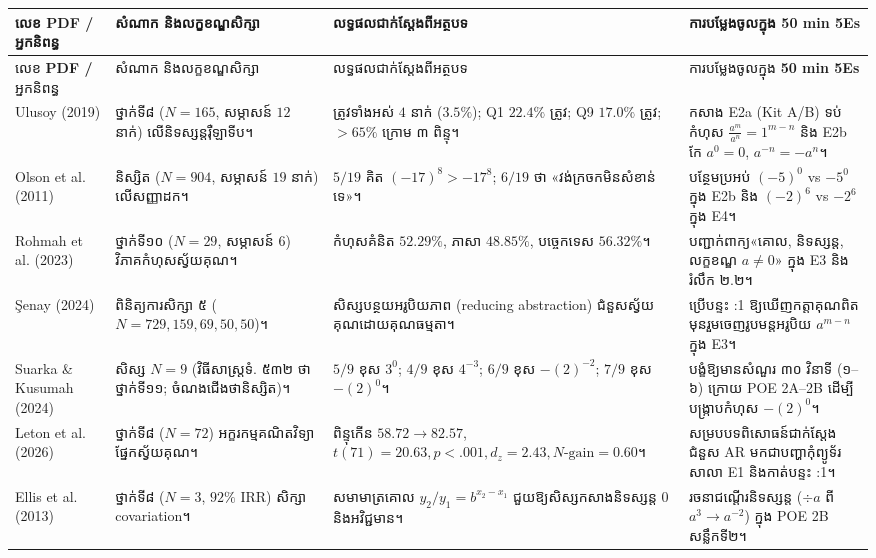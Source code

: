 \documentclass[a4paper,12pt]{article}
\newcommand{\en}[1]{{\TimesEn #1}}
\newcommand{\enbf}[1]{{\TimesEn\bfseries #1}}
\newcommand{\tblhead}[1]{{\linespread{1.0}\muol\fontsize{10.2pt}{16pt}\selectfont #1\par}}
\begin{document}
{\linespread{1.0}\fontsize{10.2pt}{15.5pt}\selectfont
\renewcommand{\arraystretch}{1.18}
\begin{longtable}{|L{2.30cm}|L{4.55cm}|L{5.10cm}|L{4.90cm}|}
\hline
{}
\tblhead{លេខ \enbf{PDF /} អ្នកនិពន្ធ} & \tblhead{សំណាក និងលក្ខខណ្ឌសិក្សា} & \tblhead{លទ្ធផលជាក់ស្ដែងពីអត្ថបទ} & \tblhead{ការបម្លែងចូលក្នុង \enbf{50 min 5Es}} \\
\hline
\endfirsthead
\hline
{}
\tblhead{លេខ \enbf{PDF /} អ្នកនិពន្ធ} & \tblhead{សំណាក និងលក្ខខណ្ឌសិក្សា} & \tblhead{លទ្ធផលជាក់ស្ដែងពីអត្ថបទ} & \tblhead{ការបម្លែងចូលក្នុង \enbf{50 min 5Es}} \\
\hline
\endhead
\en{[01] Ulusoy (2019)} & ថ្នាក់ទី៨ ($N=165$, សម្ភាសន៍ $12$ នាក់) លើនិទស្សន្តរ៉ឺឡាទីប។ & ត្រូវទាំងអស់ $4$ នាក់ ($3.5\%$); \en{Q1} $22.4\%$ ត្រូវ; \en{Q9} $17.0\%$ ត្រូវ; $>65\%$ ក្រោម ៣ ពិន្ទុ។ & កសាង \en{E2a (Kit A/B)} ទប់កំហុស $\frac{a^m}{a^n}=1^{m-n}$ និង \en{E2b} កែ $a^0=0$, $a^{-n}=-a^n$។ \\
\hline
\en{[02] Olson et al. (2011)} & និស្សិត ($N=904$, សម្ភាសន៍ $19$ នាក់) លើសញ្ញាដក។ & $5/19$ គិត $(-17)^8>-17^8$; $6/19$ ថា «វង់ក្រចកមិនសំខាន់ទេ»។ & បន្ថែមប្រអប់ $(-5)^0$ \en{vs} $-5^0$ ក្នុង \en{E2b} និង $(-2)^6$ \en{vs} $-2^6$ ក្នុង \en{E4}។ \\
\hline
\en{[03] Rohmah et al. (2023)} & ថ្នាក់ទី១០ ($N=29$, សម្ភាសន៍ $6$) វិភាគកំហុសស្វ័យគុណ។ & កំហុសគំនិត $52.29\%$, ភាសា $48.85\%$, បច្ចេកទេស $56.32\%$។ & បញ្ជាក់ពាក្យ«គោល, និទស្សន្ត, លក្ខខណ្ឌ $a\neq 0$» ក្នុង \en{E3} និងរំលឹក ២.២។ \\
\hline
\en{[04] \c{S}enay (2024)} & ពិនិត្យការសិក្សា ៥ ($N=729, 159, 69, 50, 50$)។ & សិស្សបន្ថយអរូបិយភាព \en{(reducing abstraction)} ជំនួសស្វ័យគុណដោយគុណធម្មតា។ & ប្រើបន្ទះ \en{1:1} ឱ្យឃើញកត្តាគុណពិតមុនរួមចេញរូបមន្តអរូបិយ $a^{m-n}$ ក្នុង \en{E3}។ \\
\hline
\en{[05] Suarka \& Kusumah (2024)} & សិស្ស $N=9$ (វិធីសាស្រ្តទំ. ៥៣២ ថាថ្នាក់ទី១១; ចំណងជើងថានិស្សិត)។ & $5/9$ ខុស $3^0$; $4/9$ ខុស $4^{-3}$; $6/9$ ខុស $-(2)^{-2}$; $7/9$ ខុស $-(2)^0$។ & បង្ខំឱ្យមានសំណួរ ៣០ វិនាទី (១--៦) ក្រោយ \en{POE 2A--2B} ដើម្បីបង្ក្រាបកំហុស $-(2)^0$។ \\
\hline
\en{[06] Leton et al. (2026)} & ថ្នាក់ទី៨ ($N=72$) អក្ខរកម្មគណិតវិទ្យាផ្នែកស្វ័យគុណ។ & ពិន្ទុកើន $58.72\to 82.57$, $t(71)=20.63, p<.001, d_z=2.43, N\text{-gain}=0.60$។ & សម្របបទពិសោធន៍ជាក់ស្ដែងជំនួស \en{AR} មកជាបញ្ហាកុំព្យូទ័រសាលា \en{E1} និងកាត់បន្ទះ \en{1:1}។ \\
\hline
\en{[07] Ellis et al. (2013)} & ថ្នាក់ទី៨ ($N=3$, $92\%$ \en{IRR}) សិក្សា \en{covariation}។ & សមាមាត្រគោល $y_2/y_1=b^{x_2-x_1}$ ជួយឱ្យសិស្សកសាងនិទស្សន្ត $0$ និងអវិជ្ជមាន។ & រចនាជណ្ដើរនិទស្សន្ត ($\div a$ ពី $a^3\to a^{-2}$) ក្នុង \en{POE 2B} សន្លឹកទី២។ \\

\end{longtable}}
\end{document}
